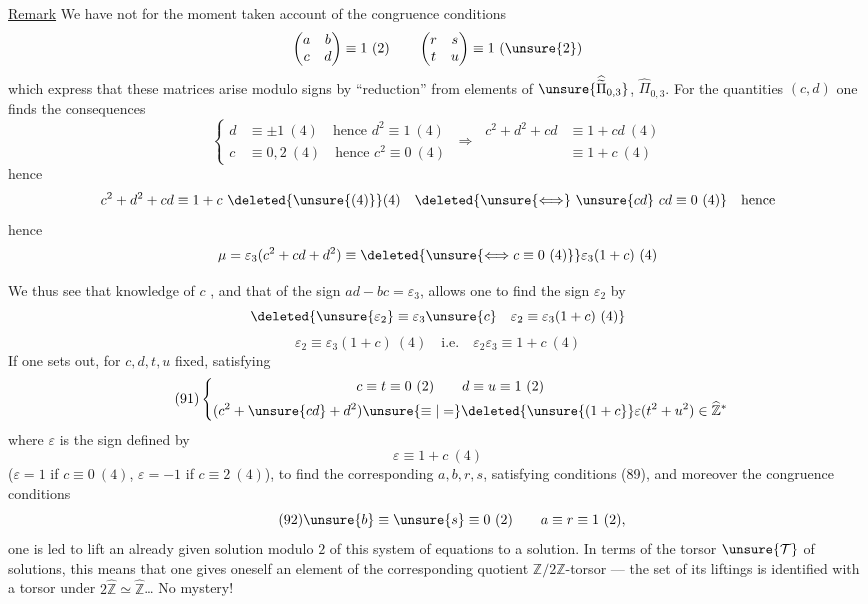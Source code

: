\uline{Remark} We have not for the moment taken account of the congruence
conditions
\[
\begin{pmatrix}a&b\\c&d\end{pmatrix}\equiv1\ (2)
\qquad
\begin{pmatrix}r&s\\t&u\end{pmatrix}\equiv1\ (\unsure{2})
\]
which express that these matrices arise modulo signs by ``reduction''
from elements of
$\unsure{\widehat{\widetilde{\Pi}}_{0,3}}$, $\widehat{\Pi}_{0,3}$.
For the quantities $(c,d)$  one finds the
consequences
\[
\left\{\begin{aligned}
d&\equiv\pm1\ (4)\quad\text{hence }d^2\equiv1\ (4)\\
c&\equiv0,2\ (4)\quad\text{hence }c^2\equiv0\ (4)
\end{aligned}\right.
\ \Longrightarrow\
\begin{aligned}
c^2+d^2+cd&\equiv1+cd\ (4)\\
&\equiv1+c\ (4)
\end{aligned}
\]
hence
\[
c^2+d^2+cd\equiv1+c\ \deleted{\unsure{(4)}}(4)
\quad\deleted{\unsure{\Longleftrightarrow}\ \unsure{cd}\ cd\equiv0\ (4)}
\quad\text{hence}
\]
hence
\[
\mu=\varepsilon_3(c^2+cd+d^2)\equiv
\deleted{\unsure{\Longleftrightarrow c\equiv0\ (4)}}
\varepsilon_3(1+c)\ (4)
\]



We thus see that knowledge of $c$ 
, and that of the sign $ad-bc=\varepsilon_3$,
allows one to find the sign $\varepsilon_2$ \deleted{\unsure{by}} by
\[
\deleted{\unsure{\varepsilon_2}\equiv\varepsilon_3\unsure{c}\quad
\varepsilon_2\equiv\varepsilon_3(1+c)\ (4)}
\]
\[
\tag{90}
\varepsilon_2\equiv\varepsilon_3(1+c)\ (4)
\quad\text{i.e.}\quad
\varepsilon_2\varepsilon_3\equiv1+c\ (4)
\]
If one sets out, for $c,d,t,u$ fixed, satisfying
\[
\tag{91}
\left\{\begin{aligned}
c&\equiv t\equiv0\ (2)\qquad d\equiv u\equiv1\ (2)\\
(c^2+\unsure{cd}+d^2)&\unsure{\equiv|=}\deleted{\unsure{(1+c}}
\varepsilon(t^2+u^2)\in\widehat{\mathbb Z}^{*}
\end{aligned}\right.
\]
where $\varepsilon$ 
is the sign defined by
\[
\varepsilon\equiv1+c\ (4)
\]
($\varepsilon=1$ if $c\equiv0\ (4)$, $\varepsilon=-1$ if
$c\equiv2\ (4)$), to find the corresponding $a,b,r,s$,
satisfying conditions (89), and moreover the congruence conditions
\[
\tag{92}
\unsure{b}\equiv\unsure{s}\equiv0\ (2)\qquad
a\equiv r\equiv1\ (2),
\]
one is led to lift an already given solution modulo $2$ of this system
of equations to a solution. In terms of the 
torsor $\unsure{\mathcal T}$ of solutions, this means that one gives oneself
an element of the corresponding quotient $\mathbb Z/2\mathbb Z$-torsor
--- the set of its liftings is identified with a torsor under
$2\widehat{\mathbb Z}\simeq\widehat{\mathbb Z}$\ldots{} No mystery!

